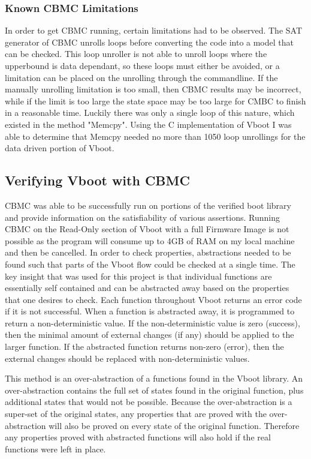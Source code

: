 \documentclass[../report.tex]{subfiles}
\begin{document}
\subsubsection{Known CBMC Limitations}

In order to get CBMC running, certain limitations had to be observed.
The SAT generator of CBMC unrolls loops before converting the code into a model that can be checked.
This loop unroller is not able to unroll loops where the upperbound is data dependant, so these loops must either be avoided, or a limitation can be placed on the unrolling through the commandline. 
If the manually unrolling limitation is too small, then CBMC results may be incorrect, while if the limit is too large the state space may be too large for CMBC to finish in a reasonable time.
Luckily there was only a single loop of this nature, which existed in the method "Memcpy".
Using the C implementation of Vboot I was able to determine that Memcpy needed no more than 1050 loop unrollings for the data driven portion of Vboot.

\subsection{Verifying Vboot with CBMC}

CBMC was able to be successfully run on portions of the verified boot library and provide information on the satisfiability of various assertions.
Running CBMC on the Read-Only section of Vboot with a full Firmware Image is not possible as the program will consume up to 4GB of RAM on my local machine and then be cancelled.
In order to check properties, abstractions needed to be found such that parts of the Vboot flow could be checked at a single time.
The key insight that was used for this project is that individual functions are essentially self contained and can be abstracted away based on the properties that one desires to check.
Each function throughout Vboot returns an error code if it is not successful.
When a function is abstracted away, it is programmed to return a
non-deterministic value.
If the non-deterministic value is zero (success), then the minimal amount of external changes (if any) should be applied to the larger function.
If the abstracted function returns non-zero (error), then the external changes should be replaced with non-deterministic values.

This method is an over-abstraction of a functions found in the Vboot library.
An over-abstraction contains the full set of states found in the original function, plus additional states that would not be possible.
Because the over-abstraction is a super-set of the original states, any properties that are proved with the over-abstraction will also be proved on every state of the original function.
Therefore any properties proved with abstracted functions will also hold if the real functions were left in place.
\end{document}

